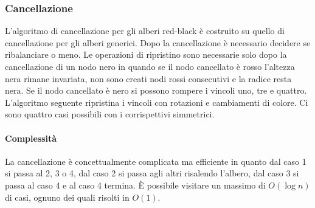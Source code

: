 \subsubsection{Cancellazione}
L'algoritmo di cancellazione per gli alberi red-black \`e costruito su quello di cancellazione per gli alberi generici. Dopo la cancellazione \`e necessario
decidere se ribalanciare o meno. Le operazioni di ripristino sono necessarie solo dopo la cancellazione di un nodo nero in quando se il nodo cancellato \`e
rosso l'altezza nera rimane invariata, non sono creati nodi rossi consecutivi e la radice resta nera. Se il nodo cancellato \`e nero si possono rompere i
vincoli uno, tre e quattro. L'algoritmo seguente ripristina i vincoli con rotazioni e cambiamenti di colore. Ci sono quattro casi possibili con i
corrispettivi simmetrici.

\paragraph{Complessit\`a}
La cancellazione \`e concettualmente complicata ma efficiente in quanto dal caso 1 si passa al 2, 3 o 4, dal caso 2 si passa agli altri risalendo l'albero,
dal caso 3 si passa al caso 4 e al caso 4 termina. \`E possibile visitare un massimo di $O(\log n)$ di casi, ognuno dei quali risolti in $O(1)$.
